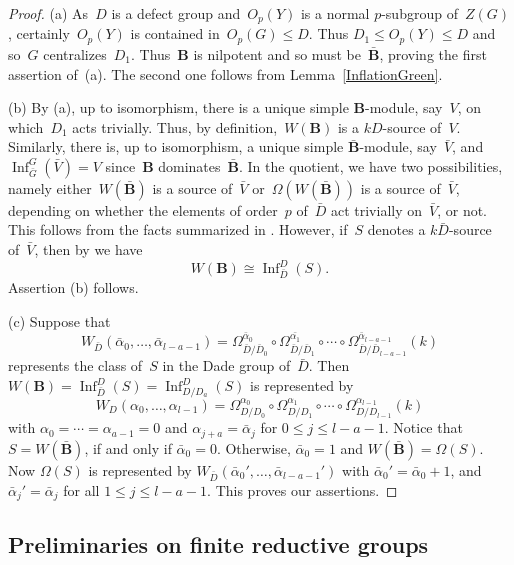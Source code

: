 \documentclass[12pt]{amsart}
\newcommand{\bB}{{\mathbf{B}}}
\DeclareMathOperator{\Inf}{Inf}                    %
\theoremstyle{theorem}
\theoremstyle{definition}
\theoremstyle{remark}
\begin{document}
\begin{proof}
(a) As~$D$ is a defect group and~$O_{p}(Y)$ is a normal $p$-subgroup
of~$Z(G)$, certainly~$O_{p}(Y)$ is contained in~$O_{p}(G) \leq D$. Thus
$D_{1} \leq O_{p}(Y) \leq D$ and so~$G$ centralizes~$D_{1}$. Thus~$\bB$ is
nilpotent and so must be~$\bar{\bB}$, proving the first assertion of~(a).
The second one follows from Lemma~\ref{InflationGreen}.

(b) By (a), up to isomorphism, there is a unique simple $\bB$-module, say~$V$,
on which~$D_{1}$ acts trivially. Thus, by definition,~$W(\bB)$ is a $kD$-source
of~$V$. Similarly, there is, up to isomorphism, a unique simple
$\bar{\bB}$-module, say~$\bar{V}$, and $\Inf_{\bar{G}}^G(\bar{V}) = V$ 
since~$\bB$ dominates~$\bar{\bB}$. In the quotient, we have two possibilities, 
namely either~$W(\bar{\bB})$ is a source of~$\bar{V}$ or~$\Omega(W(\bar{\bB}))$
is a source of~$\bar{V}$, depending on whether the elements of order~$p$ 
of~$\bar{D}$ act trivially on~$\bar{V}$, or not. This follows from the facts 
summarized in 
\cite[Subsections~$3.5$ and~$4.2$]{HL20}. However, if~$S$ denotes a 
$k\bar{D}$-source of~$\bar{V}$, then by \cite[Proposition~2]{Harris08} we have
$$W(\bB) \cong \Inf_{\bar{D}}^{D}(S).$$
Assertion (b) follows. 

(c) Suppose that 
$$W_{\bar{D}}( \bar{\alpha}_0, \ldots , \bar{\alpha}_{l-a-1} ) = 
\Omega_{\bar{D}/\bar{D}_0}^{\bar{\alpha}_0} \circ
\Omega_{\bar{D}/\bar{D}_1}^{\bar{\alpha_1}} \circ \cdots \circ
\Omega_{\bar{D}/\bar{D}_{l-a-1}}^{\bar{\alpha}_{l - a - 1}}(k)$$
represents the class of~$S$ in the Dade group of~$\bar{D}$. Then 
$W( \bB ) = \Inf_{\bar{D}}^{D}(S) = \Inf_{{D/D_a}}^{D}(S)$ is represented by
\[
W_D(\alpha_0,\ldots,\alpha_{l-1})
=\Omega_{D/D_0}^{\alpha_0}\circ\Omega_{D/D_1}^{\alpha_1}\circ\cdots
\circ\Omega_{D/D_{l-1}}^{\alpha_{l-1}}(k)
\]
with $\alpha_{0} = \cdots = \alpha_{a-1} = 0$ and $\alpha_{j + a} =
\bar{\alpha}_j$ for $0 \leq j \leq l - a - 1$.
Notice that $S = W( \bar{\bB} )$, if and only if $\bar{\alpha}_0 = 0$.
Otherwise, $\bar{\alpha}_0 = 1$ and $W( \bar{\bB} ) = \Omega( S )$.
Now $\Omega( S )$ is represented by
$W_{\bar{D}}( \bar{\alpha}_0', \ldots , \bar{\alpha}_{l-a-1}' )$ with
$\bar{\alpha}_0' = \bar{\alpha}_0 + 1$, and 
$\bar{\alpha}_j' = \bar{\alpha}_j$ for all $1 \leq j \leq l - a - 1$.
This proves our assertions.
\end{proof}

\subsection{Preliminaries on finite reductive groups}
\end{document}
